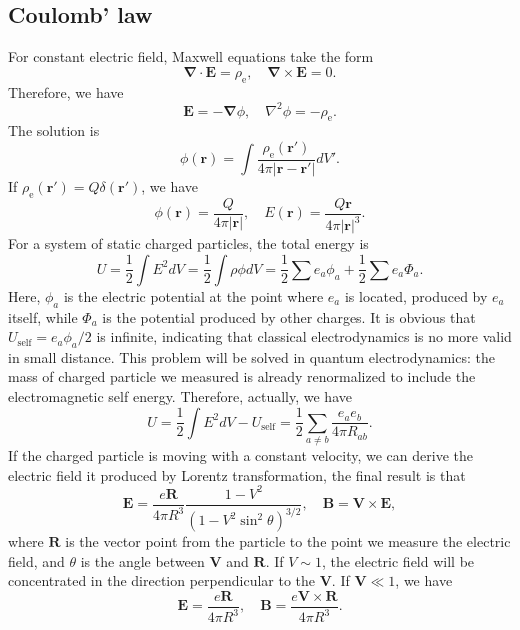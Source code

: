\subsection{Coulomb' law}
For constant electric field, Maxwell equations take the form 
\[\bm{\nabla} \cdot \bm{E} = \rho_{\mathrm{e}} , \quad \bm{\nabla} \times \bm{E} = 0.\]
Therefore, we have
\[\bm{E} = -\bm{\nabla} \phi , \quad \nabla^2 \phi = -\rho_{\mathrm{e}} .\]
The solution is
\[\phi(\bm{r}) = \int  \frac{\rho_{\mathrm{e}}(\bm{r}')}{4\pi|\bm{r}-\bm{r}'|} dV'.\]
If $\rho_{\mathrm{e}}(\bm{r}') = Q \delta(\bm{r}')$, we have
\[\phi(\bm{r}) =  \frac{Q}{4\pi|\bm{r}|} , \quad E(\bm{r}) = \frac{Q\bm{r}}{4\pi|\bm{r}|^3}.\]
For a system of static charged particles, the total energy is
\[U = \frac{1}{2}\int E^2 dV = \frac{1}{2} \int \rho \phi dV = \frac{1}{2} \sum e_a \phi_a + \frac{1}{2}\sum e_a \Phi_a.\]
Here, $\phi_a$ is the electric potential at the point where $e_a$ is located, produced by $e_a$ itself, while  $\Phi_a$ is the potential produced by other charges. It is obvious that $U_{\mathrm{self}} =  e_a \phi_a/2$ is infinite, indicating that classical electrodynamics is no more valid in small distance. This problem will be solved in quantum electrodynamics: the mass of charged particle we measured is already renormalized to include the electromagnetic self energy. Therefore, actually, we have
\[U = \frac{1}{2}\int E^2 dV - U_{\mathrm{self}} = \frac{1}{2}\sum_{a \ne b} \frac{e_a e_b}{4\pi R_{ab}}.\]
If the charged particle is moving with a constant velocity, we can derive the electric field it produced by Lorentz transformation, the final result is that
\[\bm{E} = \frac{e\bm{R}}{4\pi R^3} \frac{1-V^2}{(1-V^2\sin^2\theta)^{3/2}} , \quad \bm{B} = \bm{V} \times \bm{E},\]
where $\bm{R}$ is the vector point from the particle to the point we measure the electric field, and $\theta$ is the angle between $\bm{V}$ and $\bm{R}$.
If $V \sim 1$, the electric field will be concentrated in the direction perpendicular to the $\bm{V}$. If $\bm{V} \ll 1$, we have
\[\bm{E} = \frac{e\bm{R}}{4\pi R^3} , \quad \bm{B} = \frac{e\bm{V} \times\bm{R}}{4\pi R^3}.\]

